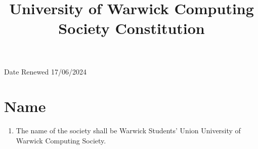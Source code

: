 \documentclass{article}
\title{\textbf{University of Warwick Computing Society Constitution} \vspace{-2cm}}
\author{}
\date{}
\begin{document}
\renewcommand{\labelenumi}{\arabic{section}.\arabic{enumi}}
\renewcommand{\labelenumii}{\arabic{section}.\arabic{enumi}.\arabic{enumii}}
\renewcommand{\labelenumiii}{\arabic{section}.\arabic{enumi}.\arabic{enumii}.\alph{enumiii}}
\maketitle

\begin{flushright}
    Date Renewed 17/06/2024
\end{flushright}

\section{Name}
\begin{enumerate}
    \item The name of the society shall be Warwick Students' Union University of Warwick Computing Society.
\end{enumerate}
\end{document}
